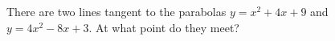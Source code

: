 There are two lines tangent to the parabolas $y=x^2+4x+9$ and $y=4x^2-8x+3$. At what point do they meet?
